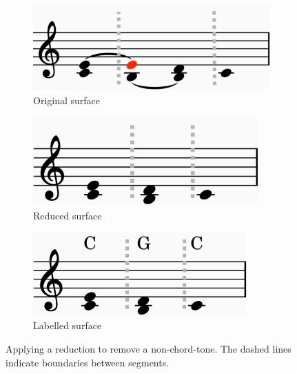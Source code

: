 \documentclass[12pt,a4paper,twoside,openany]{report} \usepackage[pdfborder={0 0 0}]{hyperref}    %
\theoremstyle{definition} \newtheorem{definition}{Definition}[section]
\begin{document}
\begin{figure}[h] 
  \centering 
  \begin{subfigure}[t]{.32\textwidth}
    \centering\includegraphics[keepaspectratio,width=\textwidth]{figs/prep/inferringHarmony/reduction/originalSurface.png}
    \caption{Original surface}
    \label{fig:pvHarmonyUnreducedInner} 
  \end{subfigure} 
  \begin{subfigure}[t]{.32\textwidth}
    \centering\includegraphics[keepaspectratio,width=0.95\textwidth]{figs/prep/inferringHarmony/reduction/reducedScore.png}
    \caption{Reduced surface}
    \label{fig:pvHarmonyReducedInner} 
  \end{subfigure}
  \begin{subfigure}[t]{.32\textwidth}
    \centering\includegraphics[keepaspectratio,width=0.9\textwidth]{figs/prep/inferringHarmony/reduction/labeledReducedScore.png}
    \caption{Labelled surface}
  \label{fig:pvHarmonyReducedInnerLabeld} 
  \end{subfigure}

  \captionsetup{width=.7\linewidth} 
  \caption{Applying a reduction to remove a non-chord-tone. The dashed lines indicate boundaries between segments.} \label{fig:pvHarmony}
\end{figure}
\end{document}
